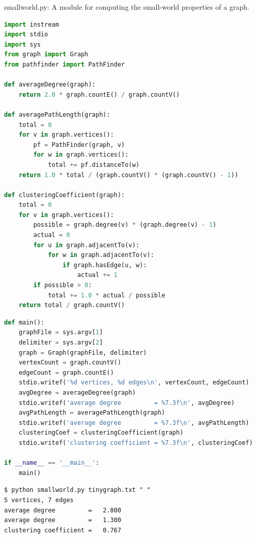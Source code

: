 \documentclass[8pt,a4paper,compress]{beamer}
\begin{document}
\begin{frame}[fragile]
\pause

\begin{framed}
\tiny smallworld.py: A module for computing the small-world properties of a graph.
\end{framed}

\begin{lstlisting}[language=Python]
import instream
import stdio
import sys
from graph import Graph
from pathfinder import PathFinder

def averageDegree(graph):
    return 2.0 * graph.countE() / graph.countV()

def averagePathLength(graph):
    total = 0
    for v in graph.vertices():
        pf = PathFinder(graph, v)
        for w in graph.vertices():
            total += pf.distanceTo(w)
    return 1.0 * total / (graph.countV() * (graph.countV() - 1))

def clusteringCoefficient(graph):
    total = 0
    for v in graph.vertices():
        possible = graph.degree(v) * (graph.degree(v) - 1)
        actual = 0
        for u in graph.adjacentTo(v):
            for w in graph.adjacentTo(v):
                if graph.hasEdge(u, w):
                    actual += 1
        if possible > 0:
            total += 1.0 * actual / possible
    return total / graph.countV()
\end{lstlisting}
\end{frame}

\begin{frame}[fragile]
\pause

\begin{lstlisting}[language=Python]
def main():
    graphFile = sys.argv[1]
    delimiter = sys.argv[2]
    graph = Graph(graphFile, delimiter)
    vertexCount = graph.countV()
    edgeCount = graph.countE()
    stdio.writef('%d vertices, %d edges\n', vertexCount, edgeCount)
    avgDegree = averageDegree(graph)
    stdio.writef('average degree         = %7.3f\n', avgDegree)
    avgPathLength = averagePathLength(graph)
    stdio.writef('average degree         = %7.3f\n', avgPathLength)
    clusteringCoef = clusteringCoefficient(graph)
    stdio.writef('clustering coefficient = %7.3f\n', clusteringCoef)

if __name__ == '__main__':
    main()
\end{lstlisting}

\pause

\begin{lstlisting}[language={}]
$ python smallworld.py tinygraph.txt " "
5 vertices, 7 edges
average degree         =   2.800
average degree         =   1.300
clustering coefficient =   0.767
\end{lstlisting}
\end{frame}
\end{document}
